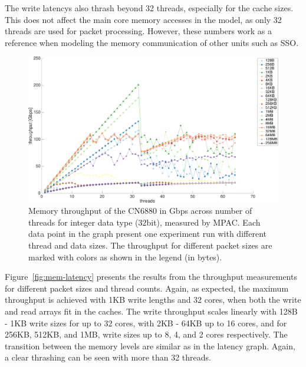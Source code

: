The write latencys also thrash beyond 32 threads, especially for the cache sizes. This does not affect the main core memory accesses in the model, as only 32 threads are used for packet processing. However, these numbers work as a reference when modeling the memory communication of other units such as SSO.

\begin{figure}[]
  \begin{center}
    \includegraphics[width=\textwidth]{images/mem-throughput.pdf}
    \caption{Memory throughput of the CN6880 in Gbps across number of threads for integer data type (32bit), measured by MPAC. Each data point in the graph present one experiment run with different thread and data sizes. The throughput for different packet sizes are marked with colors as shown in the legend (in bytes).}
    \label{fig:mem-throughput}
  \end{center}
\end{figure}

Figure~\ref{fig:mem-latency} presents the results from the throughput measurements for different packet sizes and thread counts. Again, as expected, the maximum throughput is achieved with 1KB write lengths and 32 cores, when both the write and read arrays fit in the caches. The write throughput scales linearly with 128B - 1KB write sizes for up to 32 cores, with 2KB - 64KB up to 16 cores, and for 256KB, 512KB, and 1MB, write sizes up to 8, 4, and 2 cores respectively. The transition between the memory levels are similar as in the latency graph. Again, a clear thrashing can be seen with more than 32 threads.


